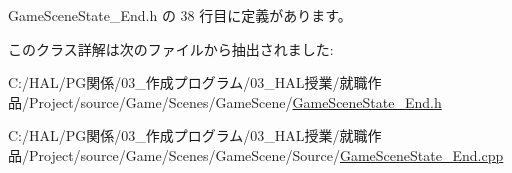  Game\+Scene\+State\+\_\+\+End.\+h の 38 行目に定義があります。



このクラス詳解は次のファイルから抽出されました\+:\begin{DoxyCompactItemize}
\item 
C\+:/\+H\+A\+L/\+P\+G関係/03\+\_\+作成プログラム/03\+\_\+\+H\+A\+L授業/就職作品/\+Project/source/\+Game/\+Scenes/\+Game\+Scene/\mbox{\hyperlink{_game_scene_state___end_8h}{Game\+Scene\+State\+\_\+\+End.\+h}}\item 
C\+:/\+H\+A\+L/\+P\+G関係/03\+\_\+作成プログラム/03\+\_\+\+H\+A\+L授業/就職作品/\+Project/source/\+Game/\+Scenes/\+Game\+Scene/\+Source/\mbox{\hyperlink{_game_scene_state___end_8cpp}{Game\+Scene\+State\+\_\+\+End.\+cpp}}\end{DoxyCompactItemize}
